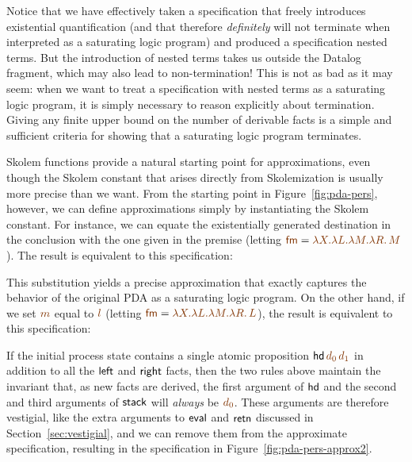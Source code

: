 Notice that we have effectively taken a specification that freely
introduces existential quantification (and that therefore {\it
  definitely} will not terminate when interpreted as a saturating
logic program) and produced a specification nested terms. But the
introduction of nested terms takes us outside the Datalog fragment,
which may also lead to non-termination! This is not as bad as it may
seem: when we want to treat a specification with nested terms as a
saturating logic program, it is simply necessary to reason explicitly
about termination. Giving any finite upper bound on the number of
derivable facts is a simple and sufficient criteria for showing that a
saturating logic program terminates.

Skolem functions provide a natural starting point for approximations,
even though the Skolem constant that arises directly from
Skolemization is usually more precise than we want. From the starting
point in Figure~\ref{fig:pda-pers}, however, we can define
approximations simply by instantiating the Skolem constant.  For
instance, we can equate the existentially generated destination in the
conclusion with the one given in the premise (letting $\lf{\sf fm} =
\lf{\lambda X. \lambda L. \lambda M. \lambda R.\, M}$). The result is
equivalent to this specification:

\smallskip
{}
\smallskip

\noindent This substitution yields a precise approximation
that exactly captures the behavior of the original PDA as a saturating
logic program. On the other hand, if we set $\lf{m}$ equal to $\lf{l}$ 
(letting $\lf{\sf fm} = \lf{\lambda X. \lambda L. \lambda M. \lambda R.\, L}$), 
the result is equivalent to this specification:

\smallskip
{}
\smallskip

If the initial process state contains a single atomic proposition
${\sf hd}\,\lf{d_0}\,\lf{d_1}$ in addition to all the ${\sf left}$ and ${\sf
  right}$ facts, then the two rules above maintain the invariant that,
as new facts are derived, the first argument of ${\sf hd}$ and the
second and third arguments of ${\sf stack}$ will {\it always} be
$\lf{d_0}$.  These arguments are therefore vestigial, like the extra
arguments to ${\sf eval}$ and ${\sf retn}$ discussed in
Section~\ref{sec:vestigial}, and we can remove them from the
approximate specification, resulting in the specification in
Figure~\ref{fig:pda-pers-approx2}. 

